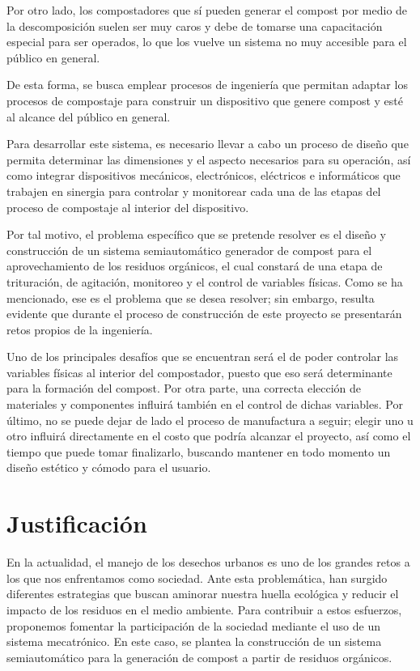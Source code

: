 Por otro lado, los compostadores que sí pueden generar el compost por medio de la descomposición suelen ser muy caros y debe de tomarse una capacitación especial para ser operados, lo que los vuelve un sistema no muy accesible para el público en general. 

De esta forma, se busca emplear procesos de ingeniería que permitan adaptar los procesos de compostaje para construir un dispositivo que genere compost y esté al alcance del público en general.

Para desarrollar este sistema, es necesario llevar a cabo un proceso de diseño que permita determinar las dimensiones y el aspecto necesarios para su operación, así como integrar dispositivos mecánicos, electrónicos, eléctricos e informáticos que trabajen en sinergia para controlar y monitorear cada una de las etapas del proceso de compostaje al interior del dispositivo. 

Por tal motivo, el problema específico que se pretende resolver es el diseño y construcción de un sistema semiautomático generador de compost para el aprovechamiento de los residuos orgánicos, el cual constará de una etapa de trituración, de agitación, monitoreo y el control de variables físicas. Como se ha mencionado, ese es el problema que se desea resolver; sin embargo, resulta evidente que durante el proceso de construcción de este proyecto se presentarán retos propios de la ingeniería.

Uno de los principales desafíos que se encuentran será el de poder controlar las variables físicas al interior del compostador, puesto que eso será determinante para la formación del compost. Por otra parte, una correcta elección de materiales y componentes influirá también en el control de dichas variables. Por último, no se puede dejar de lado el proceso de manufactura a seguir; elegir uno u otro influirá directamente en el costo que podría alcanzar el proyecto, así como el tiempo que puede tomar finalizarlo, buscando mantener en todo momento un diseño estético y cómodo para el usuario.

\section{Justificación}

En la actualidad, el manejo de los desechos urbanos es uno de los grandes retos a los que nos enfrentamos como sociedad. Ante esta problemática, han surgido diferentes estrategias que buscan aminorar nuestra huella ecológica y reducir el impacto de los residuos en el medio ambiente. Para contribuir a estos esfuerzos, proponemos fomentar la participación de la sociedad mediante el uso de un sistema mecatrónico. En este caso, se plantea la construcción de un sistema semiautomático para la generación de compost a partir de residuos orgánicos.

